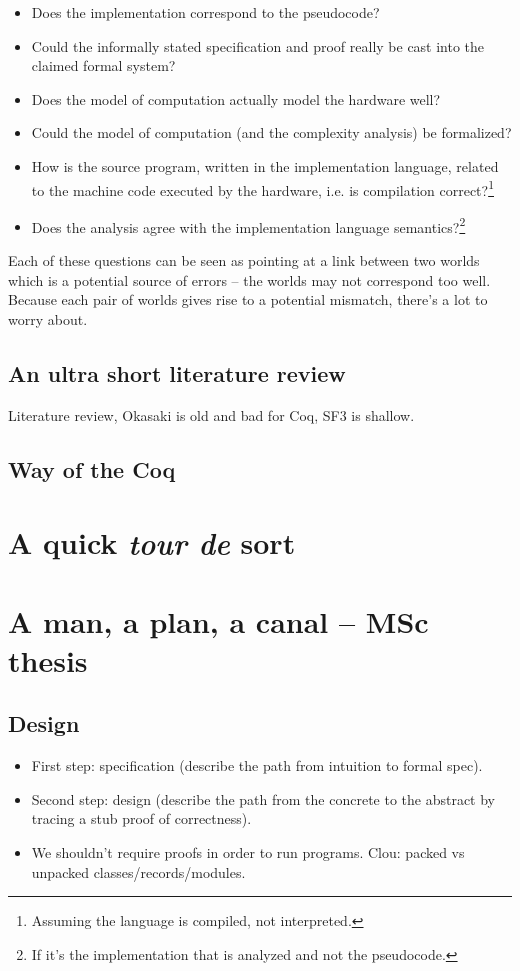 \documentclass[declaration,mgr,english,shortabstract]{iithesis}
\begin{document}
\begin{itemize}
    \item Does the implementation correspond to the pseudocode?
    \item Could the informally stated specification and proof really be cast into the claimed formal system?
    \item Does the model of computation actually model the hardware well?
    \item Could the model of computation (and the complexity analysis) be formalized?
    \item How is the source program, written in the implementation language, related to the machine code executed by the hardware, i.e. is compilation correct?\footnote{Assuming the language is compiled, not interpreted.}
    \item Does the analysis agree with the implementation language semantics?\footnote{If it's the implementation that is analyzed and not the pseudocode.}
\end{itemize}

Each of these questions can be seen as pointing at a link between two worlds which is a potential source of errors -- the worlds may not correspond too well. Because each pair of worlds gives rise to a potential mismatch, there's a lot to worry about.




\section{An ultra short literature review} \label{ch1s4}

Literature review, Okasaki is old and bad for Coq, SF3 is shallow.

\section{Way of the Coq} \label{ch1s5}

\chapter{A quick \textit{tour de} sort} \label{ch2}


\chapter{A man, a plan, a canal -- MSc thesis}

\section{Design}
\begin{itemize}
    \item First step: specification (describe the path from intuition to formal spec).
    \item Second step: design (describe the path from the concrete to the abstract by tracing a stub proof of correctness).
    \item We shouldn't require proofs in order to run programs. Clou: packed vs unpacked classes/records/modules.
\end{itemize}
\end{document}
